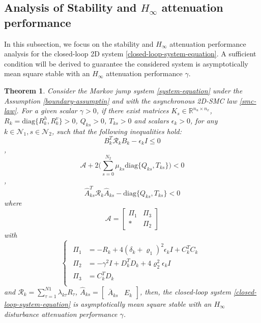 \documentclass[conference]{IEEEtran}
\newtheorem{theorem}{Theorem}
\begin{document}
	
\subsection{Analysis of Stability and $H_{\infty}$ attenuation performance } \label{stability&H_infty}
 In this subsection, we focus on the stability and $H_{\infty}$ attenuation performance analysis for the closed-loop 2D system \eqref{closed-loop-system-equation}. A sufficient condition will be derived to guarantee the considered system is  asymptotically mean square stable with an $H_{\infty}$ attenuation performance $\gamma$.
\begin{theorem}\label{theorem1}
	Consider the  Markov jump system \eqref{system-equation} under the Assumption \eqref{boundary-assumptin} and with the asynchronous 2D-SMC law \eqref{smc-law}. For a given scalar $\gamma>0$, if there exist matrices $K_{s}\in\mathbb{R}^{n_u\times n_x}$,  $R_{k}=\mathrm{diag}\{R^{h}_{k},R^{v}_{k}\}>0$,  $Q_{ks}>0$, $T_{ks}>0$ and scalars $\epsilon_{k}>0$, for any $k\in\mathcal{N}_{1}, s\in\mathcal{N}_{2}$,  such that the following inequalities hold: 
	\begin{equation}\label{T1C1}
	B^{T}_{k}  	\mathcal{R}_{k} B_{k} -\epsilon_{k}I \leq 0
	\end{equation},
	\begin{equation}\label{T1C2}
	\mathcal{A} +2\Big(\sum_{s=0}^{N_{2}}\mu_{ks} \mathrm{diag}\{Q_{ks}, T_{ks}\}\Big) < 0
	\end{equation},
	\begin{equation}\label{T1C3}
	\hat{A}^{T}_{ks}\mathcal{R}_{k}\hat{A}_{ks} - \mathrm{diag}\{Q_{ks}, T_{ks}\} < 0
	\end{equation}
	where
	\begin{equation*}
	\mathcal{A}=\begin{bmatrix}
	\varPi_{1} & \varPi_{3}\\
	*&\varPi_{2}
	\end{bmatrix}
	\end{equation*} with
	\begin{equation*} \label{varPi}
	\left\{
	\begin{array}{lr}
	\begin{split}
	\varPi_{1}&=-R_{k}+4(\delta_{k}+\varrho_{1})^{2}\epsilon_{k}I+C^{T}_{k}C_{k}\\
	\varPi_{2}&=-\gamma^{2}I+D^{T}_{k}D_{k}+4\varrho_{2}^{2}\epsilon_{k}I\\
	\varPi_{3}&= C_{k}^{T}D_{k}\\
	\end{split}
	\end{array}
	\right.
	\end{equation*}
	and $\mathcal{R}_{k}=\sum_{\tau=1}^{N1}\lambda_{k\tau}R_{\tau}$, $\hat{A}_{ks}=\begin{bmatrix}
	\bar{A}_{ks}& E_{k}
	\end{bmatrix}$, 
	then, the closed-loop system \eqref{closed-loop-system-equation} is asymptotically mean square stable with an $H_{\infty}$ disturbance attenuation performance $\gamma$.
\end{theorem}
\end{document}

